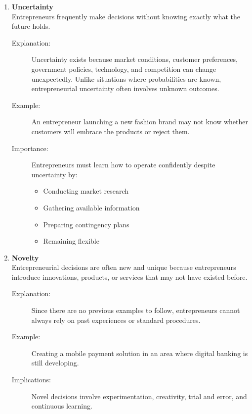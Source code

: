 \documentclass[12pt,a4paper]{article}
\begin{document}
\begin{enumerate}
    \item \textbf{Uncertainty} \\
    Entrepreneurs frequently make decisions without knowing exactly what the future holds.
    \begin{description}
        \item[Explanation:] Uncertainty exists because market conditions, customer preferences, government policies, technology, and competition can change unexpectedly. Unlike situations where probabilities are known, entrepreneurial uncertainty often involves unknown outcomes.
        \item[Example:] An entrepreneur launching a new fashion brand may not know whether customers will embrace the products or reject them.
        \item[Importance:] Entrepreneurs must learn how to operate confidently despite uncertainty by:
        \begin{itemize}
            \item Conducting market research
            \item Gathering available information
            \item Preparing contingency plans
            \item Remaining flexible
        \end{itemize}
    \end{description}

    \item \textbf{Novelty} \\
    Entrepreneurial decisions are often new and unique because entrepreneurs introduce innovations, products, or services that may not have existed before.
    \begin{description}
        \item[Explanation:] Since there are no previous examples to follow, entrepreneurs cannot always rely on past experiences or standard procedures.
        \item[Example:] Creating a mobile payment solution in an area where digital banking is still developing.
        \item[Implications:] Novel decisions involve experimentation, creativity, trial and error, and continuous learning.
    \end{description}


\end{enumerate}
\end{document}
